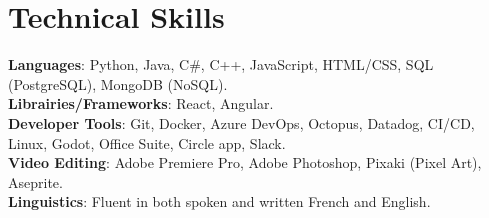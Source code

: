 \documentclass[letterpaper,11pt]{article}
\begin{document}
\section{Technical Skills}
 \begin{itemize}[leftmargin=0.15in, label={}]
    \small{\item{
     \textbf{Languages}{: Python, Java, C\#, C++, JavaScript, HTML/CSS, SQL (PostgreSQL), MongoDB (NoSQL).} \\
     \textbf{Librairies/Frameworks}{: React, Angular.} \\
     \textbf{Developer Tools}{: Git, Docker, Azure DevOps, Octopus, Datadog, CI/CD, Linux, Godot, Office Suite, Circle app, Slack.} \\
     \textbf{Video Editing}{: Adobe Premiere Pro, Adobe Photoshop, Pixaki (Pixel Art), Aseprite.} \\
     \textbf{Linguistics}{: Fluent in both spoken and written French and English.}
    }}
 \end{itemize}



\end{document}
